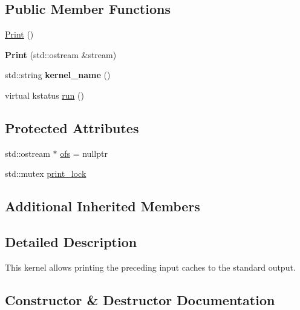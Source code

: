 \subsection*{Public Member Functions}
\begin{DoxyCompactItemize}
\item 
\hyperlink{classral_1_1batch_1_1Print_aaed27582de95fe7378e54b038ea969c4}{Print} ()
\item 
\mbox{\label{classral_1_1batch_1_1Print_adb248e266c2d6c7fe879a32bd452aaaa}} 
{\bfseries Print} (std\+::ostream \&stream)
\item 
\mbox{\label{classral_1_1batch_1_1Print_a62ad2aa4fa2ed1ce619ca17e0978d560}} 
std\+::string {\bfseries kernel\+\_\+name} ()
\item 
virtual kstatus \hyperlink{classral_1_1batch_1_1Print_aaa9c9b3999fa088344f8505fcf201721}{run} ()
\end{DoxyCompactItemize}
\subsection*{Protected Attributes}
\begin{DoxyCompactItemize}
\item 
std\+::ostream $\ast$ \hyperlink{classral_1_1batch_1_1Print_ac8e0a4119f3eff330f4b69bdafeb97d4}{ofs} = nullptr
\item 
std\+::mutex \hyperlink{classral_1_1batch_1_1Print_a655fa9f15b425b603f69476e8fd0059d}{print\+\_\+lock}
\end{DoxyCompactItemize}
\subsection*{Additional Inherited Members}


\subsection{Detailed Description}
This kernel allows printing the preceding input caches to the standard output. 

\subsection{Constructor \& Destructor Documentation}
\mbox{\label{classral_1_1batch_1_1Print_aaed27582de95fe7378e54b038ea969c4}} 
